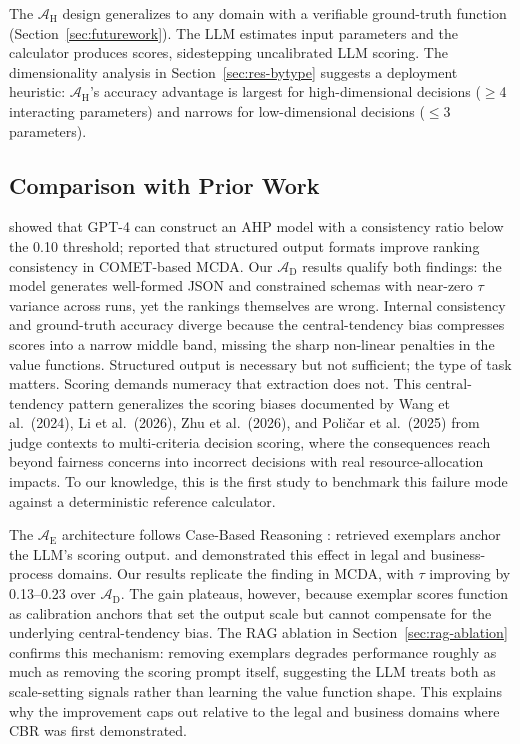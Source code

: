 \documentclass[a4paper,fleqn]{cas-dc}
\begin{document}
The $\mathcal{A}_{\text{H}}$ design generalizes to any domain with a verifiable ground-truth function (Section~\ref{sec:futurework}). The LLM estimates input parameters and the calculator produces scores, sidestepping uncalibrated LLM scoring. The dimensionality analysis in Section~\ref{sec:res-bytype} suggests a deployment heuristic: $\mathcal{A}_{\text{H}}$'s accuracy advantage is largest for high-dimensional decisions ($\geq$4 interacting parameters) and narrows for low-dimensional decisions ($\leq$3 parameters).

\subsection{Comparison with Prior Work}
\label{sec:comparison}

\citet{svoboda2024} showed that GPT-4 can construct an AHP model with a consistency ratio below the 0.10 threshold; \citet{icaart26} reported that structured output formats improve ranking consistency in COMET-based MCDA. Our $\mathcal{A}_{\text{D}}$ results qualify both findings: the model generates well-formed JSON and constrained schemas with near-zero $\tau$ variance across runs, yet the rankings themselves are wrong. Internal consistency and ground-truth accuracy diverge because the central-tendency bias compresses scores into a narrow middle band, missing the sharp non-linear penalties in the value functions. Structured output is necessary but not sufficient; the type of task matters. Scoring demands numeracy that extraction does not. This central-tendency pattern generalizes the scoring biases documented by Wang et al.\ (2024), Li et al.\ (2026), Zhu et al.\ (2026), and Poličar et al.\ (2025) from judge contexts to multi-criteria decision scoring, where the consequences reach beyond fairness concerns into incorrect decisions with real resource-allocation impacts. To our knowledge, this is the first study to benchmark this failure mode against a deterministic reference calculator.

The $\mathcal{A}_{\text{E}}$ architecture follows Case-Based Reasoning \citep{aamodtplaza1994}: retrieved exemplars anchor the LLM's scoring output. \citet{wiratunga2024cbrrag} and \citet{minorkaucher2024} demonstrated this effect in legal and business-process domains. Our results replicate the finding in MCDA, with $\tau$ improving by 0.13--0.23 over $\mathcal{A}_{\text{D}}$. The gain plateaus, however, because exemplar scores function as calibration anchors that set the output scale but cannot compensate for the underlying central-tendency bias. The RAG ablation in Section~\ref{sec:rag-ablation} confirms this mechanism: removing exemplars degrades performance roughly as much as removing the scoring prompt itself, suggesting the LLM treats both as scale-setting signals rather than learning the value function shape. This explains why the improvement caps out relative to the legal and business domains where CBR was first demonstrated.
\end{document}
